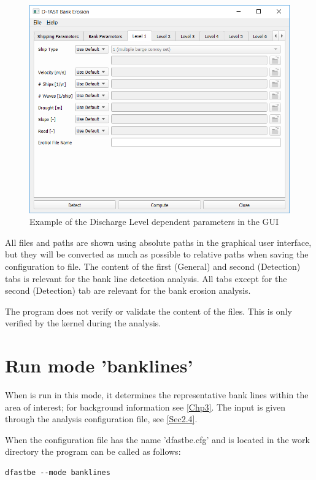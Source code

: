 \begin{figure}
\center
\includegraphics[width=\textwidth]{figures/gui6.png}
\caption{Example of the Discharge Level dependent parameters in the GUI}
\label{guiLevelX}
\end{figure}

All files and paths are shown using absolute paths in the graphical user interface, but they will be converted as much as possible to relative paths when saving the configuration to file.
The content of the first (General) and second (Detection) tabs is relevant for the bank line detection analysis.
All tabs except for the second (Detection) tab are relevant for the bank erosion analysis.

\Note The program does not verify or validate the content of the files.
This is only verified by the kernel during the analysis.

\section{Run mode 'banklines'}

When \dfastbe is run in this mode, it determines the representative bank lines within the area of interest; for background information see \autoref{Chp3}.
The input is given through the analysis configuration file, see \autoref{Sec2.4}.

When the configuration file has the name 'dfastbe.cfg' and is located in the work directory the program can be called as follows:

\begin{Verbatim}
dfastbe --mode banklines
\end{Verbatim}

